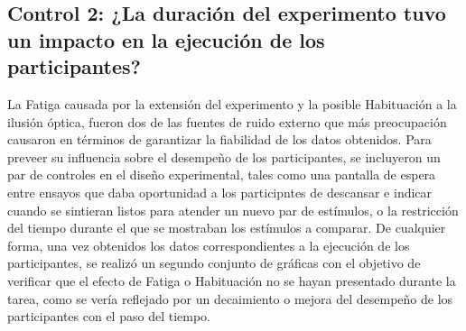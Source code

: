 \begin{itemize}

\end{itemize}




\subsection{Control 2: ¿La duración del experimento tuvo un impacto en la ejecución de los participantes?}

La Fatiga causada por la extensión del experimento y la posible Habituación a la ilusión óptica, fueron dos de las fuentes de ruido externo que más preocupación causaron en términos de garantizar la fiabilidad de los datos obtenidos. Para preveer su influencia sobre el desempeño de los participantes, se incluyeron un par de controles en el diseño experimental, tales como una pantalla de espera entre ensayos que daba oportunidad a los participntes de descansar e indicar cuando se sintieran listos para atender un nuevo par de estímulos, o la restricción del tiempo durante el que se mostraban los estímulos a comparar. De cualquier forma, una vez obtenidos los datos correspondientes a la ejecución de los participantes, se realizó un segundo conjunto de gráficas con el objetivo de verificar que el efecto de Fatiga o Habituación no se hayan presentado durante la tarea, como se vería reflejado por un decaimiento o mejora del desempeño de los participantes con el paso del tiempo.\\ 

